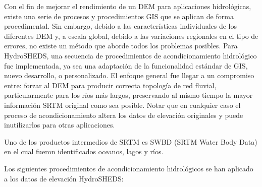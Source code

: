 \documentclass[10pt,a4paper, twoside]{report}
\begin{document}
Con el fin de mejorar el rendimiento de un DEM para aplicaciones hidrológicas, existe una serie de procesos y procedimientos GIS que se aplican de forma procedimental. Sin embargo, debido a las características individuales de los diferentes DEM y, a escala global, debido a las variaciones regionales en el tipo de errores, no existe un método que aborde todos los problemas posibles. Para HydroSHEDS, una secuencia de procedimientos de acondicionamiento hidrológico fue implementada, ya sea una adaptación de la funcionalidad estándar de GIS, nuevo desarrollo, o personalizado. El enfoque general fue llegar a un compromiso entre: forzar al DEM para producir correcta topología de red fluvial, particularmente para los ríos más largos, preservando al mismo tiempo la mayor información SRTM original como sea posible. Notar que en cualquier caso el proceso de acondicionamiento altera los datos de elevación originales y puede inutilizarlos para otras aplicaciones.

Uno de los productos intermedios de SRTM es SWBD (SRTM Water Body Data) en el cual fueron identificados oceanos, lagos y ríos.

Los siguientes procedimientos de acondicionamiento hidrológicos se han aplicado a los datos de elevación HydroSHEDS:
\end{document}
